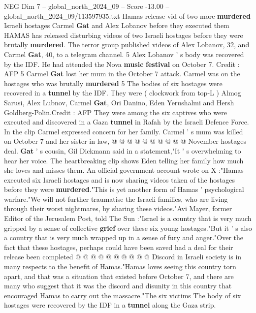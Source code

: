 \begin{textsample}{NEG Dim 7 – global\_north\_2024\_09 – Score -13.00 – global\_north\_2024\_09/113597935.txt}  \label{ex:f7_neg_006}
Hamas release vid of two more \textbf{murdered} Israeli hostages Carmel \textbf{Gat} and Alex Lobanov before they executed them HAMAS has released disturbing videos of two Israeli hostages before they were brutally \textbf{murdered}.
The terror group published videos of Alex Lobanov, 32, and Carmel \textbf{Gat}, 40, to a telegram channel. 5 Alex Lobanov ' s body was recovered by the IDF.
He had attended the Nova \textbf{music} \textbf{festival} on October 7.
Credit : AFP 5 Carmel \textbf{Gat} lost her mum in the October 7 attack.
Carmel was on the hostages who was brutally \textbf{murdered} 5 The bodies of six hostages were recovered in a \textbf{tunnel} by the IDF.
They were ( clockwork from top-L ) Almog Sarusi, Alex Lubnov, Carmel \textbf{Gat}, Ori Danino, Eden Yerushalmi and Hersh Goldberg-Polin.Credit : AFP They were among the six captives who were executed and discovered in a Gaza \textbf{tunnel} in Rafah by the Israeli Defence Force.
In the clip Carmel expressed concern for her family.
Carmel ' s mum was killed on October 7 and her sister-in-law, @ @ @ @ @ @ @ @ @ @ November hostages deal. \textbf{Gat} ' s cousin, Gil Dickmann said in a statement,"It ' s overwhelming to hear her voice.
The heartbreaking clip shows Eden telling her family how much she loves and misses them.
An official government account wrote on X :"Hamas executed six Israeli hostages and is now sharing videos taken of the hostages before they were \textbf{murdered}."This is yet another form of Hamas ' psychological warfare."We will not further traumatise the Israeli families, who are living through their worst nightmares, by sharing these videos."Avi Mayer, former Editor of the Jerusalem Post, told The Sun :"Israel is a country that is very much gripped by a sense of collective \textbf{grief} over these six young hostages."But it ' s also a country that is very much wrapped up in a sense of fury and anger."Over the fact that these hostages, perhaps could have been saved had a deal for their release been completed @ @ @ @ @ @ @ @ @ @ Discord in Israeli society is in many respects to the benefit of Hamas."Hamas loves seeing this country torn apart, and that was a situation that existed before October 7, and there are many who suggest that it was the discord and disunity in this country that encouraged Hamas to carry out the massacre."The six victims The body of six hostages were recovered by the IDF in a \textbf{tunnel} along the Gaza strip.

\end{textsample}
